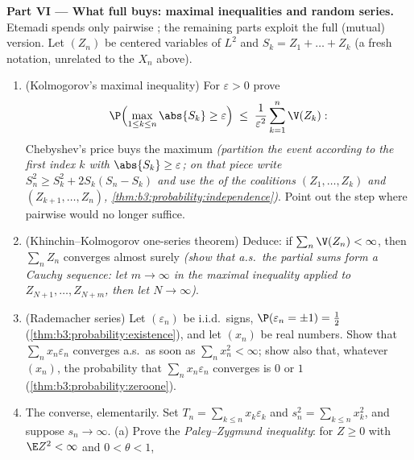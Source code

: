 \begin{problem}
\medskip
\noindent\textbf{Part VI --- What full  buys:
maximal inequalities and random series.} Etemadi spends
only pairwise ; the remaining parts exploit the
full (mutual) version. Let $(Z_n)$ be  centered
variables of $L^2$ and $S_k = Z_1 + \dots + Z_k$ (a fresh
notation, unrelated to the $X_n$ above).
\begin{enumerate}[resume]
  \item (Kolmogorov's maximal inequality) For $\varepsilon
        > 0$ prove
        \[
        \P\Bigl(\max_{1\leq k\leq n}\abs{S_k} \geq
        \varepsilon\Bigr) \;\leq\;
        \frac1{\varepsilon^2}\sum_{k=1}^n\V(Z_k) :
        \]
        Chebyshev's price buys the maximum \emph{(partition
        the event according to the first index $k$ with
        $\abs{S_k} \geq \varepsilon$; on that piece write
        $S_n^2 \geq S_k^2 + 2S_k(S_n - S_k)$ and use the
         of the coalitions $(Z_1, \dots, Z_k)$
        and $(Z_{k+1}, \dots, Z_n)$,
        \cref{thm:b3:probability:independence})}. Point out
        the step where pairwise  would no
        longer suffice.
  \item (Khinchin--Kolmogorov one-series theorem) Deduce:
        if $\sum_n\V(Z_n) < \infty$, then $\sum_nZ_n$
        converges almost surely \emph{(show that a.s.\ the
        partial sums form a Cauchy sequence: let $m \to
        \infty$ in the maximal inequality applied to
        $Z_{N+1}, \dots, Z_{N+m}$, then let $N \to
        \infty$)}.
  \item (Rademacher series) Let $(\varepsilon_n)$ be
        i.i.d.\ signs, $\P(\varepsilon_n = \pm1) =
        \frac12$ (\cref{thm:b3:probability:existence}), and
        let $(x_n)$ be real numbers. Show that
        $\sum_nx_n\varepsilon_n$ converges a.s.\ as soon as
        $\sum_nx_n^2 < \infty$; show also that, whatever
        $(x_n)$, the probability that
        $\sum_nx_n\varepsilon_n$ converges is $0$ or $1$
        (\cref{thm:b3:probability:zeroone}).
  \item The converse, elementarily. Set $T_n = \sum_{k\leq
        n}x_k\varepsilon_k$ and $s_n^2 = \sum_{k\leq
        n}x_k^2$, and suppose $s_n \to \infty$.
        (a) Prove the \emph{Paley--Zygmund inequality}: for
        $Z \geq 0$ with $\E Z^2 < \infty$ and $0 < \theta <
        1$,
        \[
\]
\end{enumerate}
\end{problem}
